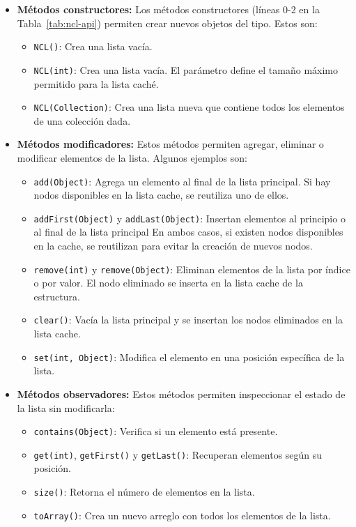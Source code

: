 \begin{itemize}
    \item \textbf{Métodos constructores:}
    Los métodos constructores (líneas 0-2 en la Tabla~\ref{tab:ncl-api}) permiten crear nuevos objetos del tipo. Estos son:
    \begin{itemize}
        \item \texttt{NCL()}: Crea una lista vacía.
        \item \texttt{NCL(int)}: Crea una lista vacía. El parámetro define el
            tamaño máximo permitido para la lista caché.
        \item \texttt{NCL(Collection)}: Crea una lista nueva que contiene todos los elementos de una colección dada.
    \end{itemize}
    \item \textbf{Métodos modificadores:}
    Estos métodos permiten agregar, eliminar o modificar elementos de la lista. Algunos ejemplos son:
    \begin{itemize}
        \item \texttt{add(Object)}: Agrega un elemento al final de la lista
            principal. Si hay nodos disponibles en la lista cache, se reutiliza uno de ellos.
        \item \texttt{addFirst(Object)} y \texttt{addLast(Object)}: Insertan elementos al principio o al final de la lista principal 
        En ambos casos, si existen nodos disponibles en la cache, se reutilizan para evitar la creación de nuevos nodos.
        \item \texttt{remove(int)} y \texttt{remove(Object)}: Eliminan elementos de la lista por índice o por valor. El nodo eliminado se inserta en la lista cache de la estructura.
        \item \texttt{clear()}: Vacía la lista principal y se insertan los nodos
            eliminados en la lista cache.
        \item \texttt{set(int, Object)}: Modifica el elemento en una posición específica de la lista.
    \end{itemize}
    \item \textbf{Métodos observadores:}  
    Estos métodos permiten inspeccionar el estado de la lista sin modificarla:
    \begin{itemize}
        \item \texttt{contains(Object)}: Verifica si un elemento está presente.
        \item \texttt{get(int)}, \texttt{getFirst()} y \texttt{getLast()}: Recuperan elementos según su posición.
        \item \texttt{size()}: Retorna el número de elementos en la lista.
        \item \texttt{toArray()}: Crea un nuevo arreglo con todos los elementos de la lista.
    \end{itemize}
\end{itemize}

